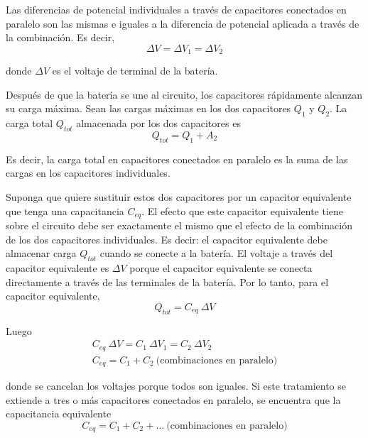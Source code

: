       \PN Las diferencias de potencial individuales a través de capacitores conectados en paralelo son las mismas e
      iguales a la diferencia de potencial aplicada a través de la combinación. Es decir,
      \begin{equation*}
        \Delta V = \Delta V_{1} = \Delta V_{2}
      \end{equation*}

      \PN donde $\Delta V$ es el voltaje de terminal de la batería.

      \VS
      \PN Después de que la batería se une al circuito, los capacitores rápidamente alcanzan su carga máxima. Sean las
      cargas máximas en los dos capacitores $Q_{1}$ y $Q_{2}$. La carga total $Q_{tot}$ almacenada por los dos
      capacitores es
      \begin{equation*}
        Q_{tot} = Q_{1} + A_{2}
      \end{equation*}

      \PN Es decir, la carga total en capacitores conectados en paralelo es la suma de las cargas en los capacitores
      individuales.

      \VS
      \PN Suponga que quiere sustituir estos dos capacitores por un capacitor equivalente que tenga una capacitancia
      $C_{eq}$. El efecto que este capacitor equivalente tiene sobre el circuito debe ser exactamente el mismo que el
      efecto de la combinación de los dos capacitores individuales. Es decir: el capacitor equivalente debe almacenar
      carga $Q_{tot}$ cuando se conecte a la batería. El voltaje a través del capacitor equivalente es $\Delta V$ porque
      el capacitor equivalente se conecta directamente a través de las terminales de la batería. Por lo tanto, para el
      capacitor equivalente,
      \begin{equation*}
        Q_{tot} = C_{eq} \ \Delta V
      \end{equation*}

      \PN Luego
      \begin{eqnarray*}
        C_{eq} \ \Delta V = C_{1} \ \Delta V_{1} = C_{2} \ \Delta V_{2} \\
        C_{eq} = C_{1} + C_{2} \ \text{(combinaciones en paralelo)}
      \end{eqnarray*}

      \PN donde se cancelan los voltajes porque todos son iguales. Si este tratamiento se extiende a tres o más
      capacitores conectados en paralelo, se encuentra que la capacitancia equivalente
      \begin{equation*}
        C_{eq} = C_{1} + C_{2} + \dotsc \ \text{(combinaciones en paralelo)}
      \end{equation*}

